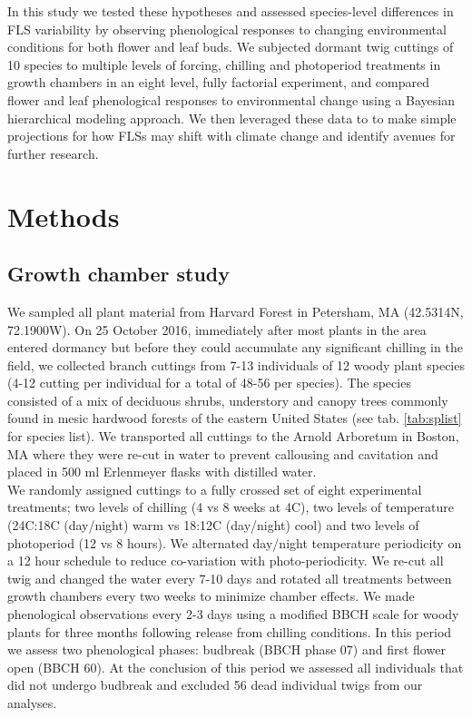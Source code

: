 \documentclass[11pt]{article}
\begin{document}
\noindent In this study we tested these hypotheses and assessed species-level differences in FLS variability by observing phenological responses to changing environmental conditions for both flower and leaf buds. %
We subjected dormant twig cuttings of 10 species to multiple levels of forcing, chilling and photoperiod treatments in growth chambers in an eight level, fully factorial experiment, and compared flower and leaf phenological responses to environmental change using a Bayesian hierarchical modeling approach. We then leveraged these data to to make simple projections for how FLSs may shift with climate change and identify avenues for further research.\\ 

\section*{Methods}

\subsection*{Growth chamber study}
\noindent We sampled all plant material from Harvard Forest in Petersham, MA (42.5314\degree N, 72.1900\degree W). On 25 October 2016, immediately after most plants in the area entered dormancy but before they could accumulate any significant chilling in the field,  we collected branch cuttings from 7-13 individuals of 12 woody plant species (4-12 cutting per individual for a total of 48-56 per species). The species consisted of a mix of deciduous shrubs, understory and canopy trees commonly found in mesic hardwood forests of the eastern United States (see tab. \ref{tab:splist} for species list). We transported all cuttings to the Arnold Arboretum in Boston, MA where they were re-cut in water to prevent callousing and cavitation and placed in 500 ml Erlenmeyer flasks with distilled water.\\ 

\noindent We randomly assigned cuttings to a fully crossed set of eight experimental treatments; two levels of chilling (4 vs 8 weeks at 4\degree C), two levels of temperature (24\degree C:18\degree C (day/night) warm vs 18\degree:12\degree C (day/night) cool) and two levels of photoperiod (12 vs 8 hours). We alternated day/night temperature periodicity on a 12 hour schedule to reduce co-variation with photo-periodicity. We re-cut all twig and changed the water every 7-10 days and rotated all treatments between growth chambers every two weeks to minimize chamber effects. We made phenological observations every 2-3 days using a modified BBCH scale for woody plants \citep{Finn2007} for three months following release from chilling conditions. In this period we assess two phenological phases: budbreak (BBCH phase 07) %
and first flower open (BBCH 60). At the conclusion of this period we assessed all individuals that did not undergo budbreak and excluded 56 dead individual twigs from our analyses. %
\end{document}

